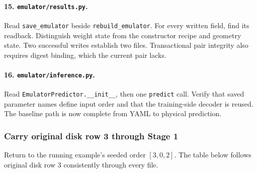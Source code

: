 \documentclass[10pt,aps,prd,twocolumn,nofootinbib]{revtex4-2}
\newcommand{\code}[1]{\texttt{#1}}
\begin{document}
\paragraph{15.  \code{emulator/results.py}.}
Read \code{save\_emulator} beside \code{rebuild\_emulator}.  For every written
field, find its readback.  Distinguish weight state from the constructor recipe
and geometry state.  Two successful writes establish two files.  Transactional
pair integrity also requires digest binding, which the current pair lacks.

\paragraph{16.  \code{emulator/inference.py}.}
Read \code{EmulatorPredictor.\_\_init\_\_}, then one \code{predict} call.  Verify
that saved parameter names define input order and that the training-side
decoder is reused.  The baseline path is now complete from YAML to physical
prediction.

\subsubsection{Carry original disk row 3 through Stage 1}

Return to the running example's seeded order $[3,0,2]$.  The table below
follows original disk row 3 consistently through every file.
\end{document}
